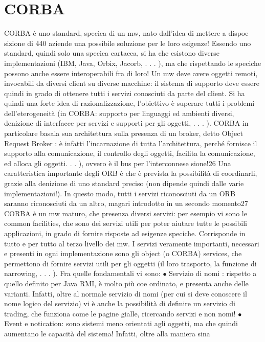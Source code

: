 \section{CORBA}
CORBA è uno standard, specica di un mw, nato dall'idea di mettere a dispoe
sizione di 440 aziende una possibile soluzione per le loro esigenze!
Essendo uno standard, quindi solo una specica cartacea, si ha che esistono
diverse implementazioni (IBM, Java, Orbix, Jacorb, . . . ), ma che rispettando le
speciche possono anche essere interoperabili fra di loro!
Un mw deve avere oggetti remoti, invocabili da diversi client su diverse macchine: il sistema di supporto deve essere
quindi in grado di ottenere tutti i servizi
conosciuti da parte del client. Si ha quindi una forte idea di razionalizzazione,
l'obiettivo è superare tutti i problemi dell'eterogeneità (in CORBA: supporto
per linguaggi ed ambienti diversi, denizione di interfacce per servizi e supporti
per gli oggetti, . . . ).
CORBA in particolare basala sua architettura sulla presenza di un broker,
detto Object Request Broker : è infatti l'incarnazione di tutta l'architettura,
perché fornisce il supporto alla comunicazione, il controllo degli oggetti, facilita
la comunicazione, ed alloca gli oggetti. . . ), ovvero è il bus per l'interconnese
sione!26 Una caratteristica importante degli ORB è che è prevista la possibilità
di coordinarli, grazie alla denizione di uno standard preciso (non dipende quindi dalle varie implementazioni!). In
questo modo, tutti i servizi riconosciuti da
un ORB saranno riconosciuti da un altro, magari introdotto in un secondo
momento27
CORBA è un mw maturo, che presenza diversi servizi: per esempio vi sono
le common facilities, che sono dei servizi utili per poter aiutare tutte le possibili
applicazioni, in grado di fornire risposte ad esigenze speciche. Corrisponde in
tutto e per tutto al terzo livello dei mw.
I servizi veramente importanti, necessari e presenti in ogni implementazione
sono gli object (o CORBA) services, che permettono di fornire servizi utili per gli
oggetti (il loro trasporto, la funzione di narrowing, . . . ). Fra quelle fondamentali
vi sono:
$\bullet$ Servizio di nomi : rispetto a quello definito per Java RMI, è molto più coe
ordinato, e presenta anche delle varianti. Infatti, oltre al normale servizio
di nomi (per cui si deve conoscere il nome logico del servizio) vi è anche la
possibilità di definire un servizio di trading, che funziona come le pagine
gialle, ricercando servizi e non nomi!
$\bullet$ Event e notication: sono sistemi meno orientati agli oggetti, ma che
quindi aumentano le capacità del sistema! Infatti, oltre alla maniera sina
